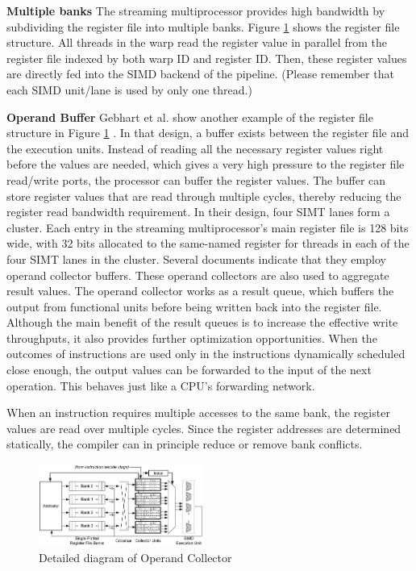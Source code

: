 \documentclass[twocolumn]{article}
\begin{document}
\noindent
\textbf{Multiple banks} 
The streaming multiprocessor provides high bandwidth by subdividing the register file into multiple banks. 
Figure \ref{fig:operand} shows the register file structure. All threads in the warp read the register value in parallel from the register file indexed by both warp ID and register ID. Then, these register values are directly fed into the SIMD backend of the pipeline. (Please remember that each SIMD unit/lane is used by only one thread.)

\noindent
\textbf{Operand Buffer} 
Gebhart et al.  show another example of the register file structure in Figure \ref{fig:operand} . In that design, a buffer exists between the register file and the execution units. Instead of
reading all the necessary register values right before the values are needed, which gives a very high pressure to the register file read/write ports, the processor can buffer the register values.
The buffer can store register values that are read through multiple cycles, thereby reducing the register read bandwidth requirement. In their design, four SIMT lanes form a cluster. Each entry in the streaming multiprocessor’s main register file is 128 bits wide, with 32 bits allocated to the same-named register for threads in each of the four SIMT lanes in the cluster. Several documents indicate that they employ operand collector buffers. These operand collectors are also used to aggregate result values. The operand collector works as a result queue, which buffers the output from functional units before being written back into the register file. Although the main benefit of the result queues is to increase the effective write throughputs, it also provides further optimization opportunities. When the outcomes of instructions are used only in the instructions dynamically scheduled close enough, the output values can be forwarded to the input of the next operation. This behaves just like a CPU’s forwarding network.

When an instruction requires multiple accesses to the same bank, the register values are read over multiple cycles. Since the register addresses are determined statically, the compiler can in principle reduce or remove bank conflicts.
\begin{figure}[htb]
        \centering
        \includegraphics[width=0.48\textwidth]{operand.jpg}
        \caption{Detailed diagram of Operand Collector}
        \label{fig:operand}
\end{figure}
\end{document}
